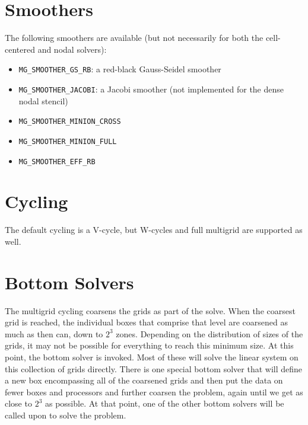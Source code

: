 \section{Smoothers}

The following smoothers are available (but not necessarily for both the
cell-centered and nodal solvers):
\begin{itemize}
\item {\tt MG\_SMOOTHER\_GS\_RB}: a red-black Gauss-Seidel smoother

\item {\tt MG\_SMOOTHER\_JACOBI}: a Jacobi smoother (not implemented for 
the dense nodal stencil)

\item {\tt MG\_SMOOTHER\_MINION\_CROSS}

\item {\tt MG\_SMOOTHER\_MINION\_FULL}

\item {\tt MG\_SMOOTHER\_EFF\_RB}
\end{itemize}



\section{Cycling}

The default cycling is a V-cycle, but W-cycles and full multigrid are
supported as well.


\section{Bottom Solvers}

The multigrid cycling coarsens the grids as part of the solve.  When 
the coarsest grid is reached, the individual boxes that comprise that
level are coarsened as much as then can, down to $2^3$ zones.  Depending
on the distribution of sizes of the grids, it may not be possible for
everything to reach this minimum size.  At this point, the bottom
solver is invoked.  Most of these will solve the linear system
on this collection of grids directly.  There is one special bottom
solver that will define a new box encompassing all of the coarsened
grids and then put the data on fewer boxes and processors and further
coarsen the problem, again until we get as close to $2^3$ as possible.
At that point, one of the other bottom solvers will be called upon
to solve the problem.

